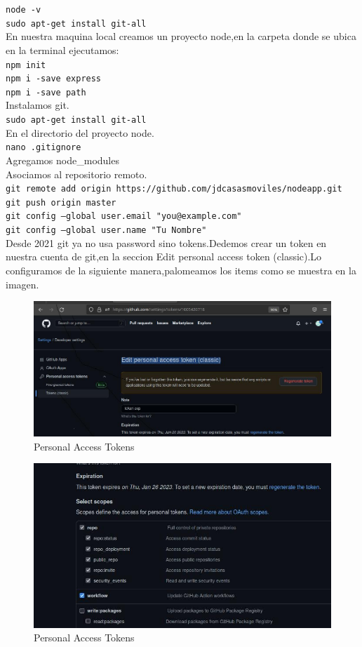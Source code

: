\texttt{node -v}\\
\texttt{sudo apt-get install git-all}\\
En nuestra maquina local creamos un proyecto node,en la carpeta donde se ubica
en la terminal ejecutamos:\\
\texttt{npm init}\\
\texttt{npm i -save express}\\
\texttt{npm i -save path}\\
Instalamos git.\\
\texttt{sudo apt-get install git-all}\\
En el directorio del proyecto node.\\
\texttt{nano  .gitignore}\\
Agregamos node\_modules\\
Asociamos al repositorio remoto.\\
\texttt{git remote add origin https://github.com/jdcasasmoviles/nodeapp.git}\\
\texttt{git push origin master}\\
\texttt{git config --global user.email "you@example.com"}\\
\texttt{git config --global user.name "Tu Nombre"}\\
Desde 2021 git ya no usa password sino tokens.Dedemos crear un token en nuestra
cuenta de git,en la seccion  Edit personal access token (classic).Lo configuramos
de la siguiente manera,palomeamos los items como se muestra en la imagen.
\begin{figure}[H] %
	\centering %
	\includegraphics[scale=0.7]{images/c4_1.jpg}
	\caption{Personal Access Tokens}
\end{figure}
\begin{figure}[H] %
	\centering %
	\includegraphics[scale=0.7]{images/c4_2.jpg}
	\caption{Personal Access Tokens}
\end{figure}
